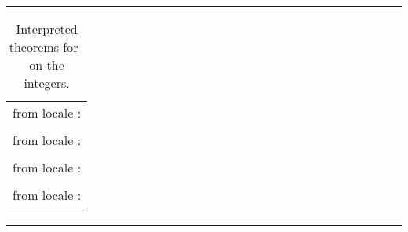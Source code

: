 \begin{isabellebody}
\begin{isamarkuptext}
\begin{table}
\hrule
\vspace{2ex}
\begin{center}
\begin{tabular}{l}
  \isa{int{\isachardot}less{\isacharunderscore}def} from locale \isa{partial{\isacharunderscore}order}: \\
  \quad \isa{{\isacharparenleft}{\isacharquery}x\ {\isacharless}\ {\isacharquery}y{\isacharparenright}\ {\isacharequal}\ {\isacharparenleft}{\isacharquery}x\ {\isasymle}\ {\isacharquery}y\ {\isasymand}\ {\isacharquery}x\ {\isasymnoteq}\ {\isacharquery}y{\isacharparenright}} \\
  \isa{int{\isachardot}meet{\isacharunderscore}left} from locale \isa{lattice}: \\
  \quad \isa{min\ {\isacharquery}x\ {\isacharquery}y\ {\isasymle}\ {\isacharquery}x} \\
  \isa{int{\isachardot}join{\isacharunderscore}distr} from locale \isa{distrib{\isacharunderscore}lattice}: \\
  \quad \isa{max\ {\isacharquery}x\ {\isacharparenleft}min\ {\isacharquery}y\ {\isacharquery}z{\isacharparenright}\ {\isacharequal}\ min\ {\isacharparenleft}max\ {\isacharquery}x\ {\isacharquery}y{\isacharparenright}\ {\isacharparenleft}max\ {\isacharquery}x\ {\isacharquery}z{\isacharparenright}} \\
  \isa{int{\isachardot}less{\isacharunderscore}total} from locale \isa{total{\isacharunderscore}order}: \\
  \quad \isa{{\isacharquery}x\ {\isacharless}\ {\isacharquery}y\ {\isasymor}\ {\isacharquery}x\ {\isacharequal}\ {\isacharquery}y\ {\isasymor}\ {\isacharquery}y\ {\isacharless}\ {\isacharquery}x}
\end{tabular}
\end{center}
\hrule
\caption{Interpreted theorems for~\isa{{\isasymle}} on the integers.}
\label{tab:int-lattice}
\end{table}


\end{isamarkuptext}
\end{isabellebody}
